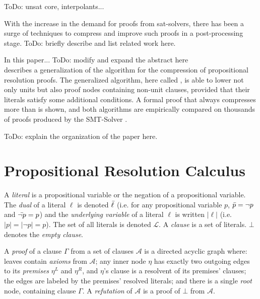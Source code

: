 \documentclass{llncs}
\begin{document}
ToDo: unsat core, interpolants...

With the increase in the demand for proofs from sat-solvers, there has been a surge of techniques to compress and improve such proofs in a post-processing stage. ToDo: briefly describe and list related work here.

In this paper...  ToDo: modify and expand the abstract here\\
 describes a generalization of the {\LowerUnits} algorithm \cite{LURPI} for the compression
of propositional resolution proofs. The generalized algorithm, here called {\LowerUnivalents}, is
able to lower not only units but also proof nodes containing non-unit clauses, provided that their
literals satisfy some additional conditions. A formal proof that {\LowerUnivalents} always
compresses more than {\LowerUnits} is shown, and both algorithms are empirically compared on
thousands of proofs produced by the SMT-Solver \veriT.

ToDo: explain the organization of the paper here.


\section{Propositional Resolution Calculus}

A \emph{literal} is a propositional variable or the negation of a propositional variable. The \emph{dual} of a literal $\ell$ is denoted
$\bar{\ell}$ (i.e. for any propositional variable $p$, $\bar{p} =
\neg p$ and $\bar{\neg p} = p$) and the \emph{underlying variable} of a literal
$\ell$ is written $|\ell|$ (i.e. $|p| = |\neg p| = p$). The set of all literals is denoted $\mathcal{L}$. A \emph{clause} is a set of literals. $\bot$ denotes the \emph{empty clause}.


\noindent
A \emph{proof} of a clause $\Gamma$ from a set of clauses $\mathcal{A}$ is a
directed acyclic graph where: leaves contain \emph{axioms} from $\mathcal{A}$;
any inner node $\eta$ has exactly two outgoing edges to its \emph{premises} $\eta^L$ and $\eta^R$, and $\eta$'s clause is a resolvent of its premises' clauses; the edges are labeled by the premises'
resolved literals; and there is a single \emph{root} node, containing clause $\Gamma$. A \emph{refutation} of $\mathcal{A}$ is a proof of $\bot$ from $\mathcal{A}$.
\end{document}
